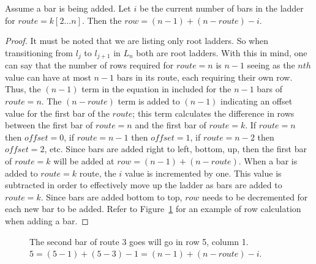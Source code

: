 \begin{lemma}
  Assume a bar is being added. Let $i$ be the current number of bars in the ladder for $route=k[2 \dots n]$.
  Then the $row=(n-1)+(n-route)-i$.
\end{lemma}
\begin{proof}
   It must be noted that we are listing only root ladders. So when transitioning from 
$l_{j}$ to $l_{j+1}$ in $L_{n}$ both are root ladders. With this in mind, one can say that the 
number of rows required for $route=n$ is $n-1$ seeing as the $nth$ value can have at most $n-1$ bars in its route, 
each requiring  their own 
row. Thus, the $(n-1)$ term in the equation in included for the $n-1$ bars of 
$route=n$. The $(n-route)$ term is added to $(n-1)$ indicating 
an offset value for the first bar of the $route$; this term calculates 
the difference in rows between the first bar of $route=n$ 
and the first bar of $route=k$. If $route=n$ 
then $offset=0$, if $route=n-1$ then $offset=1$, if $route=n-2$ then $offset=2$, etc.
Since bars are added right to left, bottom, up, then the first bar of $route=k$ will be added 
at $row=(n-1)+(n-route)$. When a bar is added to $route=k$ route, the $i$ value is incremented by one. This value is subtracted in 
order to effectively move up the ladder as bars are added to $route=k$. Since bars are added 
bottom to top, $row$ needs to be decremented for each new bar to be added. Refer to Figure~\ref{Fig:SJTcase1} for an example of 
row calculation when adding a bar.
\end{proof}
\begin{figure}[!htp]
  \begin{center}
    

\end{center}
\caption{The second bar of route 3 goes will go in row 5, column 1. $5 = (5-1)+(5-3)-1 = (n-1)+(n-route)-i$.}
\label{Fig:SJTcase1}
\end{figure}
\pagebreak


